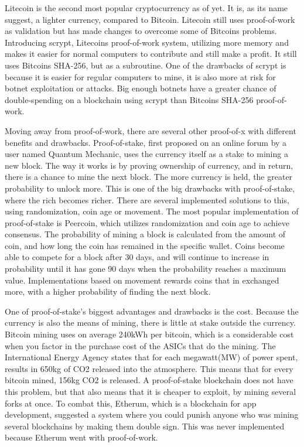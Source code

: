 \documentclass[11pt]{article}
\begin{document}
Litecoin is the second most popular cryptocurrency as of yet. It is, as its name suggest, a lighter currency, compared to Bitcoin. Litecoin still uses proof-of-work as validation but has made changes to overcome some of Bitcoins problems. Introducing scrypt, Litecoins proof-of-work system, utilizing more memory and makes it easier for normal computers to contribute and still make a profit. It still uses Bitcoins SHA-256, but as a subroutine. One of the drawbacks of scrypt is because it is easier for regular computers to mine, it is also more at risk for botnet exploitation or attacks. Big enough botnets have a greater chance of double-spending on a blockchain using scrypt than Bitcoins SHA-256 proof-of-work.

Moving away from proof-of-work, there are several other proof-of-x with different benefits and drawbacks. Proof-of-stake, first proposed on an online forum by a user named Quantum Mechanic, uses the currency itself as a stake to mining a new block. The way it works is by proving ownership of currency, and in return, there is a chance to mine the next block. The more currency is held, the greater probability to unlock more. This is one of the big drawbacks with proof-of-stake, where the rich becomes richer. There are several implemented solutions to this, using randomization, coin age or movement. The most popular implementation of proof-of-stake is Peercoin, which utilizes randomization and coin age to achieve consensus. The probability of mining a block is calculated from the amount of coin, and how long the coin has remained in the specific wallet. Coins become able to compete for a block after 30 days, and will continue to increase in probability until it has gone 90 days when the probability reaches a maximum value. Implementations based on movement rewards coins that in exchanged more, with a higher probability of finding the next block. 

One of proof-of-stake's biggest advantages and drawbacks is the cost. Because the currency is also the means of mining, there is little at stake outside the currency. Bitcoin mining uses on average 240kWh per bitcoin, which is a considerable cost when you factor in the purchase cost of the ASICs that do the mining. The International Energy Agency states that for each megawatt(MW) of power spent, results in 650kg of CO2 released into the atmosphere. This means that for every bitcoin mined, 156kg CO2 is released. A proof-of-stake blockchain does not have this problem, but that also means that it is cheaper to exploit, by mining several forks at once. To combat this, Etherum, which is a blockchain for app development, suggested a system where you could punish anyone who was mining several blockchains by making them double sign. This was never implemented because Etherum went with proof-of-work. 
\end{document}
